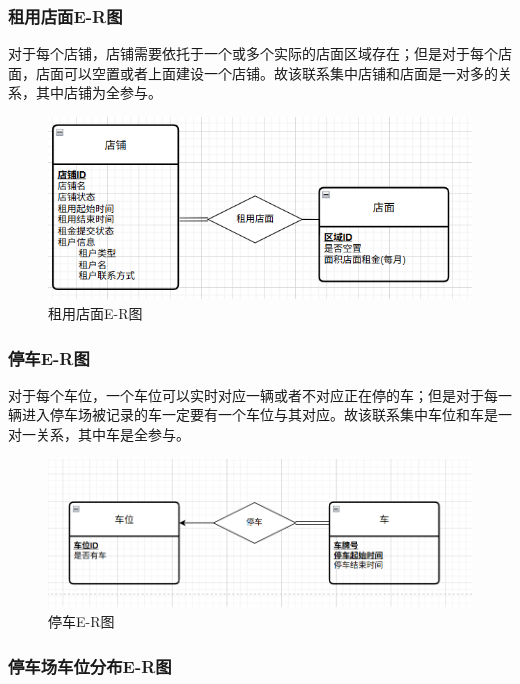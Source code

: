 \documentclass[]{article}
\let\oldincludegraphics\includegraphics
\renewcommand{\includegraphics}[2][]{%
  \begin{center}\oldincludegraphics[#1]{#2}\end{center}%
}
\begin{document}
\hypertarget{ux79dfux7528ux5e97ux9762e-rux56fe}{%
\subsubsection{租用店面E-R图}\label{ux79dfux7528ux5e97ux9762e-rux56fe}}

对于每个店铺，店铺需要依托于一个或多个实际的店面区域存在；但是对于每个店面，店面可以空置或者上面建设一个店铺。故该联系集中店铺和店面是一对多的关系，其中店铺为全参与。

\begin{figure}[htbp]
\centering
\includegraphics{image2.png}
\caption{租用店面E-R图}
\end{figure}

\hypertarget{ux505cux8f66e-rux56fe}{%
\subsubsection{停车E-R图}\label{ux505cux8f66e-rux56fe}}

对于每个车位，一个车位可以实时对应一辆或者不对应正在停的车；但是对于每一辆进入停车场被记录的车一定要有一个车位与其对应。故该联系集中车位和车是一对一关系，其中车是全参与。

\begin{figure}[htbp]
\centering
\includegraphics{image3.png}
\caption{停车E-R图}
\end{figure}

\hypertarget{ux505cux8f66ux573aux8f66ux4f4dux5206ux5e03e-rux56fe}{%
\subsubsection{停车场车位分布E-R图}\label{ux505cux8f66ux573aux8f66ux4f4dux5206ux5e03e-rux56fe}}
\end{document}
